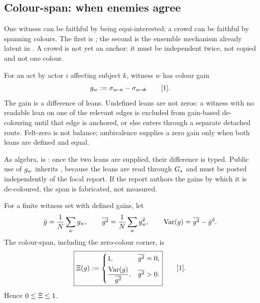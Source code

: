 \documentclass[../main]{subfiles}
\begin{document}
\subsection{Colour-span: when enemies agree}
\label{subsec:colour-span}
%
One witness can be faithful by being equi-interested; a crowd can be faithful by spanning
colours. The first is ; the second is the ensemble mechanism already latent in
. A crowd is not yet an anchor: it must be independent twice, not copied and
not one colour.

\begin{definition}
  For an act by actor $i$ affecting subject $k$, witness $w$ has colour gain
  \begin{equation}
    g\sb{w}:=\sigma\sb{ w\!\to\!i }-\sigma\sb{ w\!\to\!k }\qquad [1].
    \label{eq:pr:gain}
  \end{equation}
  The gain is a difference of leans. Undefined leans are not zeros: a witness with no
  readable lean on one of the relevant edges is excluded from gain-based de-colouring until
  that edge is anchored, or else enters through a separate detached route. Felt-zero is not
  balance; ambivalence supplies a zero gain only when both leans are defined and equal.
\end{definition}

As algebra,  is : once the two leans are supplied, their
difference is typed. Public use of $g\sb{w}$ inherits , because
the leans are read through $G\sb{\star}$ and must be posted independently of the focal
report. If the report authors the gains by which it is de-coloured, the span is fabricated,
not measured.

\begin{definition}
  For a finite witness set with defined gains, let
  \begin{equation}
    \meancolourgain=\frac1{\countof}\sum_w\colourgain{w},\qquad
    \meansqcolourgain=\frac1{\countof}\sum_w\colourgain{w}^{2},\qquad
    \varcolourgain=\meansqcolourgain-\meancolourgain^{2}.
    \label{eq:pr:span-moments}
  \end{equation}
  The colour-span, including the zero-colour corner, is
  \begin{equation}
    \boxed{
    \Xi(g):=
    \begin{cases}
      1, & \overline{g\sp{2}}=0,\\[4pt]
      \dfrac{\operatorname{Var}(g)}{\overline{g\sp{2}}}, & \overline{g\sp{2}}>0.
    \end{cases}}
    \qquad [1].
    \label{eq:pr:span}
  \end{equation}
  Hence $0\le\Xi\le1$.
\end{definition}
\end{document}
